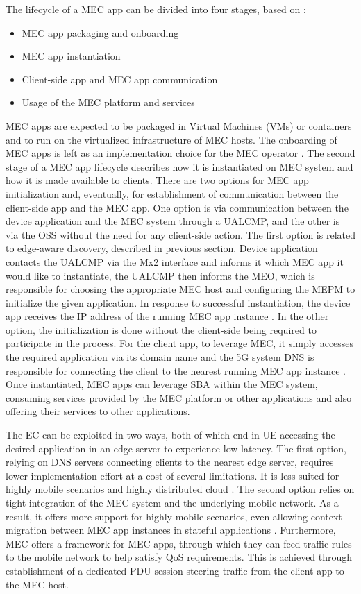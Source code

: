 \documentclass[12pt,a4paper,twoside]{report}
\begin{document}
The lifecycle of a MEC app can be divided into four stages, based on \cite{ETSI:wp20}:
\begin{itemize}
	\item MEC app packaging and onboarding
	\item MEC app instantiation 
	\item Client-side app and MEC app communication 
	\item Usage of the MEC platform and services 
\end{itemize}
MEC apps are expected to be packaged in Virtual Machines (VMs) or containers and to run on the virtualized infrastructure of MEC hosts. The onboarding of MEC apps is left as an implementation choice for the MEC operator \cite{ETSI:wp20}. The second stage of a MEC app lifecycle describes how it is instantiated on MEC system and how it is made available to clients. There are two options for MEC app initialization and, eventually, for establishment of communication between the client-side app and the MEC app. One option is via communication between the device application and the MEC system through a UALCMP, and the other is via the OSS without the need for any client-side action. The first option is related to edge-aware discovery, described in previous section. Device application contacts the UALCMP via the Mx2 interface and informs it which MEC app it would like to instantiate, the UALCMP then informs the MEO, which is responsible for choosing the appropriate MEC host and configuring the MEPM to initialize the given application. In response to successful instantiation, the device app receives the IP address of the running MEC app instance \cite{ETSI:wp20}. In the other option, the initialization is done without the client-side being required to participate in the process. For the client app, to leverage MEC, it simply accesses the required application via its domain name and the 5G system DNS is responsible for connecting the client to the nearest running MEC app instance \cite{ETSI:wp20,ETSI:wp36}. Once instantiated, MEC apps can leverage SBA within the MEC system, consuming services provided by the MEC platform or other applications and also offering their services to other applications.

The EC can be exploited in two ways, both of which end in UE accessing the desired application in an edge server to experience low latency. The first option, relying on DNS servers connecting clients to the nearest edge server, requires lower implementation effort at a cost of several limitations. It is less suited for highly mobile scenarios and highly distributed cloud \cite{ETSI:wp36}. The second option relies on tight integration of the MEC system and the underlying mobile network. As a result, it offers more support for highly mobile scenarios, even allowing context migration between MEC app instances in stateful applications \cite{ETSI:wp36}. Furthermore, MEC offers a framework for MEC apps, through which they can feed traffic rules to the mobile network to help satisfy QoS requirements. This is achieved through establishment of a dedicated PDU session steering traffic from the client app to the MEC host.
\end{document}
